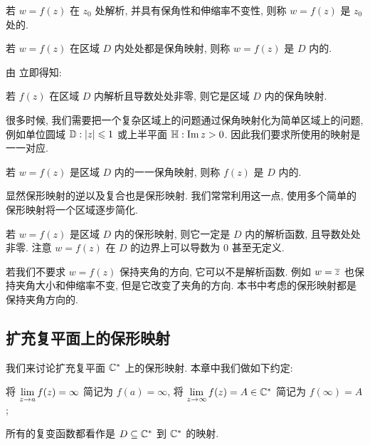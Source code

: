 \begin{definition}
  \begin{enuma}
    \item 若 $w=f(z)$ 在 $z_0$ 处解析, 并具有保角性和伸缩率不变性, 则称 $w=f(z)$ 是 $z_0$ 处的.
    \item 若 $w=f(z)$ 在区域 $D$ 内处处都是保角映射, 则称 $w=f(z)$ 是 $D$ 内的.
  \end{enuma}
\end{definition}

由 立即得知:
\begin{theorem}
  若 $f(z)$ 在区域 $D$ 内解析且导数处处非零, 则它是区域 $D$ 内的保角映射.
\end{theorem}

很多时候, 我们需要把一个复杂区域上的问题通过保角映射化为简单区域上的问题, 例如单位圆域 ${\mathbb{D}}:\lvert z\rvert\leqslant1$ 或上半平面 ${\mathbb{H}}:\operatorname{Im} z>0$.
因此我们要求所使用的映射是一一对应.

\begin{definition}
  若 $w=f(z)$ 是区域 $D$ 内的一一保角映射, 则称 $f(z)$ 是 $D$ 内的.\footnotemark
\end{definition}

显然保形映射的逆以及复合也是保形映射.
我们常常利用这一点, 使用多个简单的保形映射将一个区域逐步简化.

若 $w=f(z)$ 是区域 $D$ 内的保形映射, 则它一定是 $D$ 内的解析函数, 且导数处处非零.
注意 $w=f(z)$ 在 $D$ 的边界上可以导数为 $0$ 甚至无定义.

若我们不要求 $w=f(z)$ 保持夹角的方向, 它可以不是解析函数.
例如 $w=\overline z$ 也保持夹角大小和伸缩率不变, 但是它改变了夹角的方向. \alert{本书中考虑的保形映射都是保持夹角方向的}.


\subsection{扩充复平面上的保形映射}

我们来讨论扩充复平面 ${\mathbb{C}}^*$ 上的保形映射.
本章中我们做如下约定:
\begin{enuma}
  \item 将 $\lim\limits_{z\rightarrow a}f(z)=\infty$ 简记为 $f(a)=\infty$, 将 $\lim\limits_{z\rightarrow \infty}f(z)=A\in{\mathbb{C}}^*$ 简记为 $f(\infty)=A$;
  \item 所有的复变函数都看作是 $D\subseteq{\mathbb{C}}^*$ 到 ${\mathbb{C}}^*$ 的映射.
\end{enuma}

